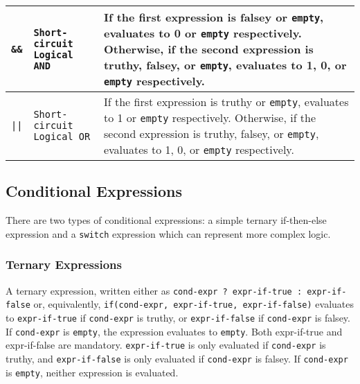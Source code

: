 \begin{table}[H]
\begin{tabular}{ |p{2cm}|p{5cm}|p{7cm}|  }
			\rule{0pt}{3ex}\texttt{\&\&} & \texttt{Short-circuit Logical AND} & {If the first expression is falsey or \texttt{empty}, evaluates to 0 or \texttt{empty} respectively. Otherwise, if the second expression is truthy, falsey, or \texttt{empty}, evaluates to 1, 0, or \texttt{empty} respectively.} \\ \hline
			\rule{0pt}{3ex}\texttt{||} & \texttt{Short-circuit Logical OR} & {If the first expression is truthy or \texttt{empty}, evaluates to 1 or \texttt{empty} respectively. Otherwise, if the second expression is truthy, falsey, or \texttt{empty}, evaluates to 1, 0, or \texttt{empty} respectively.} \\ \hline
			\end{tabular}
			\end{table}

\subsection{Conditional Expressions}
			There are two types of conditional expressions: a simple ternary if-then-else expression and a \texttt{switch} expression which can represent more complex logic.

\subsubsection{Ternary Expressions}
\label{sec:Ternary}
A ternary expression, written either as \texttt{cond-expr ? expr-if-true : expr-if-false} or, equivalently, \texttt{if(cond-expr, expr-if-true, expr-if-false)} evaluates to \texttt{expr-if-true} if \texttt{cond-expr} is truthy, or \texttt{expr-if-false} if \texttt{cond-expr} is falsey. If \texttt{cond-expr} is \texttt{empty}, the expression evaluates to \texttt{empty}. Both expr-if-true and expr-if-false are mandatory. \texttt{expr-if-true} is only evaluated if \texttt{cond-expr} is truthy, and \texttt{expr-if-false} is only evaluated if \texttt{cond-expr} is falsey. If \texttt{cond-expr} is \texttt{empty}, neither expression is evaluated.

